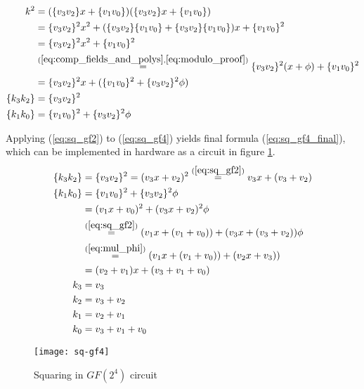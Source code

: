 \begin{equation}
\label{eq:sq_gf4}
\begin{aligned}
k^2 &= (\{v_3v_2\}x + \{v_1v_0\})(\{v_3v_2\}x + \{v_1v_0\})\\
&= \{v_3v_2\}^2x^2 + (\{v_3v_2\}\{v_1v_0\} + \{v_3v_2\}\{v_1v_0\})x + \{v_1v_0\}^2 \\
&= \{v_3v_2\}^2x^2 + \{v_1v_0\}^2 \\
&\stackrel{(\ref{eq:comp_fields_and_polys}, \ref{eq:modulo_proof})}{=}
\{v_3v_2\}^2(x + \phi) + \{v_1v_0\}^2 \\
&= \{v_3v_2\}^2x + (\{v_1v_0\}^2 + \{v_3v_2\}^2\phi)\\
\{k_3k_2\} &= \{v_3v_2\}^2 \\
\{k_1k_0\} &= \{v_1v_0\}^2 + \{v_3v_2\}^2\phi
\end{aligned}
\end{equation}

Applying (\ref{eq:sq_gf2}) to (\ref{eq:sq_gf4}) yields final formula (\ref{eq:sq_gf4_final}), which can be implemented in hardware as a circuit in figure \ref{fig:sq_gf4}.
\begin{equation}
\label{eq:sq_gf4_final}
\begin{aligned}
\{k_3k_2\} &= \{v_3v_2\}^2 = (v_3x + v_2)^2
\stackrel{(\ref{eq:sq_gf2})}{=}
v_3x + (v_3 + v_2)\\
\{k_1k_0\} &= \{v_1v_0\}^2 + \{v_3v_2\}^2\phi \\
&= (v_1x + v_0)^2 + (v_3x + v_2)^2\phi \\
&\stackrel{(\ref{eq:sq_gf2})}{=}
(v_1x + (v_1 + v_0)) + (v_3x + (v_3 + v_2))\phi \\
&\stackrel{(\ref{eq:mul_phi})}{=}
(v_1x + (v_1 + v_0)) + (v_2x + v_3)) \\
&= (v_2 + v_1)x + (v_3 + v_1 + v_0) \\
k_3 &= v_3 \\
k_2 &= v_3 + v_2 \\
k_1 &= v_2 + v_1 \\
k_0 &= v_3 + v_1 + v_0
\end{aligned}
\end{equation}

\begin{figure}[!h]
\centering
\texttt{[image: sq-gf4]}
\caption{Squaring in $GF(2^4)$ circuit}
\label{fig:sq_gf4}
\end{figure}
